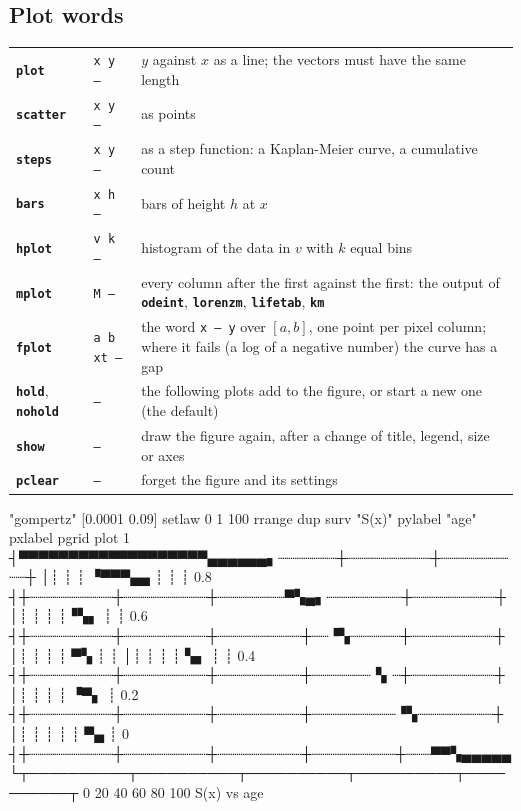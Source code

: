 \documentclass[11pt,letterpaper]{article}
\newcommand{\cmd}[1]{\texttt{\textbf{#1}}}
\newcommand{\stk}[1]{\texttt{#1}}
\begin{document}
\subsection{Plot words}

\begin{center}
\begin{tabular}{@{}l>{\raggedright\arraybackslash}p{}>{\raggedright\arraybackslash}p{}@{}}
\toprule
\cmd{plot} & \stk{x y --} & $y$ against $x$ as a line; the vectors must have the same length \\
\cmd{scatter} & \stk{x y --} & as points \\
\cmd{steps} & \stk{x y --} & as a step function: a Kaplan-Meier curve, a cumulative count \\
\cmd{bars} & \stk{x h --} & bars of height $h$ at $x$ \\
\cmd{hplot} & \stk{v k --} & histogram of the data in $v$ with $k$ equal bins \\
\cmd{mplot} & \stk{M --} & every column after the first against the first: the output of \cmd{odeint}, \cmd{lorenzm}, \cmd{lifetab}, \cmd{km} \\
\cmd{fplot} & \stk{a b xt --} & the word \stk{x -- y} over $[a, b]$, one point per pixel column; where it fails (a log of a negative number) the curve has a gap \\
\cmd{hold}, \cmd{nohold} & \stk{--} & the following plots add to the figure, or start a new one (the default) \\
\cmd{show} & \stk{--} & draw the figure again, after a change of title, legend, size or axes \\
\cmd{pclear} & \stk{--} & forget the figure and its settings \\
\bottomrule
\end{tabular}
\end{center}
\begin{rpn}
"gompertz" [0.0001 0.09] setlaw
0 1 100 rrange dup surv "S(x)" pylabel "age" pxlabel pgrid plot
       1 ┤▀▀▀▀▀▀▀▀▀▀▀▀▀▀▀▀▀▀▀▄▄▄▄▄▄▖┈┈┈┈┈┈┈┼┈┈┈┈┈┈┈┈┈┈┼┈┈┈┈┈┈┈┈┈┈┼
         │┊          ┊          ┊  ▝▀▀▀▄▄  ┊          ┊          ┊
     0.8 ┤┼┈┈┈┈┈┈┈┈┈┈┼┈┈┈┈┈┈┈┈┈┈┼┈┈┈┈┈┈┈┈▀▚▄▖┈┈┈┈┈┈┈┈┈┼┈┈┈┈┈┈┈┈┈┈┼
         │┊          ┊          ┊          ┊▝▚▖       ┊          ┊
     0.6 ┤┼┈┈┈┈┈┈┈┈┈┈┼┈┈┈┈┈┈┈┈┈┈┼┈┈┈┈┈┈┈┈┈┈┼┈┈▝▚┈┈┈┈┈┈┼┈┈┈┈┈┈┈┈┈┈┼
         │┊          ┊          ┊          ┊    ▀▚    ┊          ┊
         │┊          ┊          ┊          ┊      ▚▖  ┊          ┊
     0.4 ┤┼┈┈┈┈┈┈┈┈┈┈┼┈┈┈┈┈┈┈┈┈┈┼┈┈┈┈┈┈┈┈┈┈┼┈┈┈┈┈┈┈▝▖┈┼┈┈┈┈┈┈┈┈┈┈┼
         │┊          ┊          ┊          ┊        ▝▀▖          ┊
     0.2 ┤┼┈┈┈┈┈┈┈┈┈┈┼┈┈┈┈┈┈┈┈┈┈┼┈┈┈┈┈┈┈┈┈┈┼┈┈┈┈┈┈┈┈┈┈▝▚┈┈┈┈┈┈┈┈┈┼
         │┊          ┊          ┊          ┊          ┊ ▀▄       ┊
       0 ┤┼┈┈┈┈┈┈┈┈┈┈┼┈┈┈┈┈┈┈┈┈┈┼┈┈┈┈┈┈┈┈┈┈┼┈┈┈┈┈┈┈┈┈┈┼┈┈┈▀▀▚▄▄▄▄▄
         └┬──────────┬──────────┬──────────┬──────────┬──────────┬
          0         20         40         60         80         100
          S(x)  vs  age
\end{rpn}
\end{document}
